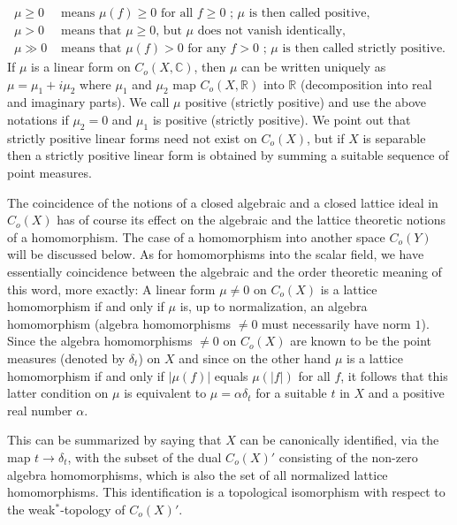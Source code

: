 \[
\begin{aligned}
	\mu \geq 0 &\text{ means } \mu(f) \geq 0 \text{ for all } f \geq 0 \text{ ; } \mu \text{ is then called positive}, \\
	\mu > 0 &\text{ means that } \mu \geq 0 \text{, but } \mu \text{ does not vanish identically}, \\
	\mu \gg 0 &\text{ means that } \mu(f) > 0 \text{ for any } f > 0 \text{ ; } \mu \text{ is then called strictly positive}.
\end{aligned}
\]
If $\mu$ is a linear form on $C_{o}(X,\mathbb{C})$, then $\mu$ can be written uniquely as $\mu = \mu_{1} + i\mu_{2}$ where $\mu_{1}$ and $\mu_{2}$ map $C_{o}(X,\mathbb{R})$ into $\mathbb{R}$ (decomposition into real and imaginary parts).
We call $\mu$ positive (strictly positive) and use the above notations if $\mu_{2} = 0$ and $\mu_{1}$ is positive (strictly positive).
We point out that strictly positive linear forms need not exist on $C_{o}(X)$, but if $X$ is separable then a strictly positive linear form is obtained by summing a suitable sequence of point measures.

The coincidence of the notions of a closed algebraic and a closed lattice ideal in $C_{o}(X)$ has of course its effect on the algebraic and the lattice theoretic notions of a homomorphism.
The case of a homomorphism into another space $C_{o}(Y)$ will be discussed below.
As for homomorphisms into the scalar field, we have essentially coincidence between the algebraic and the order theoretic meaning of this word, more exactly: A linear form $\mu \neq 0$ on $C_{o}(X)$ is a lattice homomorphism if and only if $\mu$ is, up to normalization, an algebra homomorphism (algebra homomorphisms $\neq 0$ must necessarily have norm $1$).
Since the algebra homomorphisms $\neq 0$ on $C_{o}(X)$ are known to be the point measures (denoted by $\delta_{t}$) on $X$ and since on the other hand $\mu$ is a lattice homomorphism if and only if $|\mu(f)|$ equals $\mu(|f|)$ for all $f$, it follows that this latter condition on $\mu$ is equivalent to $\mu = \alpha\delta_{t}$ for a suitable $t$ in $X$ and a positive real number $\alpha$.

This can be summarized by saying that $X$ can be canonically identified, via the map $t \to \delta_{t}$, with the subset of the dual $C_{o}(X)'$ consisting of the non-zero algebra homomorphisms, which is also the set of all normalized lattice homomorphisms.
This identification is a topological isomorphism with respect to the weak$^{*}$-topology of $C_{o}(X)'$.

